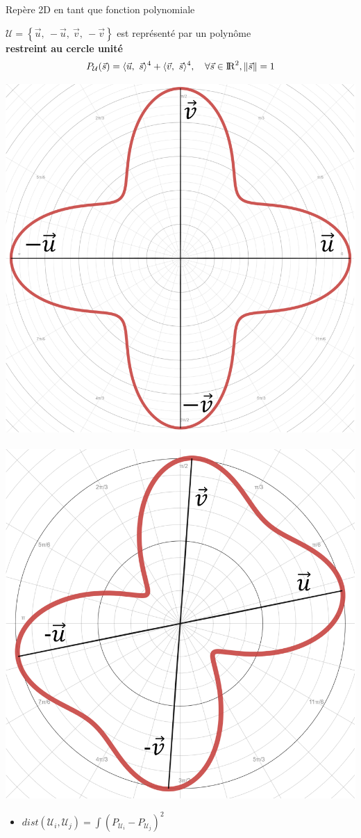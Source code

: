 \begin{frame}{Repère 2D en tant que fonction polynomiale}
    \centering
    
$\mathcal{U} = \left\{\vec{u},\ -\vec{u},\ \vec{v},\ -\vec{v}\right\}$  est représenté par un polynôme \\
\textbf{restreint au cercle unité}
$$P_\mathcal{U}(\vec{s}) = \langle \vec{u},\ \vec{s}\rangle^{4} +  \langle \vec{v},\ \vec{s}\rangle^{4}, \ \ \   \forall \vec{s} \in {\rm I\!R}^2, \lVert \vec{s} \rVert = 1$$

     \includegraphics[width=0.3\linewidth]{img_spm_ff/anoted_orthogonal.PNG}
    \ \ \ 
       \includegraphics[width=0.3\linewidth]{img_spm_ff/anoted_polynome.PNG}
    \\
    
    \normalsize
    \begin{itemize}
     \item $dist(\mathcal{U}_i, \mathcal{U}_j) = \int (P_{\mathcal{U}_i} - P_{\mathcal{U}_j})^2$
    \end{itemize}
\end{frame}

